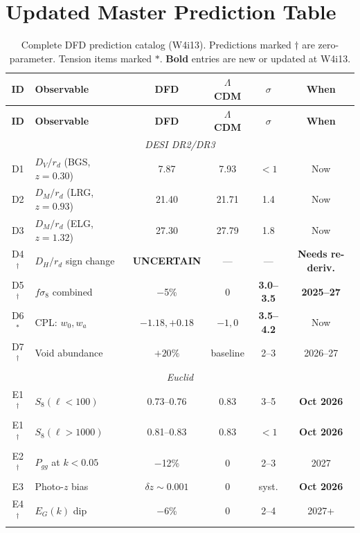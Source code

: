 \documentclass[11pt,a4paper]{article}
\newcommand{\LCDM}{$\Lambda$CDM}
\begin{document}
\section{Updated Master Prediction Table}
\label{sec:master_table}

\begin{longtable}{clcccc}
\caption{Complete DFD prediction catalog (W4i13). Predictions marked
$\dagger$ are zero-parameter. Tension items marked $\ast$. \textbf{Bold}
entries are new or updated at W4i13.} \\
\toprule
\textbf{ID} & \textbf{Observable} & \textbf{DFD} &
\textbf{\LCDM} & \textbf{$\sigma$} & \textbf{When} \\
\midrule
\endfirsthead
\toprule
\textbf{ID} & \textbf{Observable} & \textbf{DFD} &
\textbf{\LCDM} & \textbf{$\sigma$} & \textbf{When} \\
\midrule
\endhead
\multicolumn{6}{c}{\textit{DESI DR2/DR3}} \\
\midrule
D1 & $D_V/r_d$ (BGS, $z=0.30$) & 7.87 & 7.93 & $<1$ & Now \\
D2 & $D_M/r_d$ (LRG, $z=0.93$) & 21.40 & 21.71 & 1.4 & Now \\
D3 & $D_M/r_d$ (ELG, $z=1.32$) & 27.30 & 27.79 & 1.8 & Now \\
D4$^{\dagger}$ & $D_H/r_d$ sign change &
\textbf{UNCERTAIN} & --- & --- & \textbf{Needs re-deriv.} \\
D5$^{\dagger}$ & $f\sigma_8$ combined & $-$5\% & 0 &
\textbf{3.0--3.5} & \textbf{2025--27} \\
D6$^{\ast}$ & CPL: $w_0, w_a$ & $-1.18, +0.18$ & $-1, 0$ &
\textbf{3.5--4.2} & Now \\
D7$^{\dagger}$ & Void abundance & $+20\%$ & baseline & 2--3 & 2026--27 \\
\midrule
\multicolumn{6}{c}{\textit{Euclid}} \\
\midrule
E1$^{\dagger}$ & $S_8(\ell<100)$ & 0.73--0.76 & 0.83 & 3--5 &
\textbf{Oct 2026} \\
E1$^{\dagger}$ & $S_8(\ell>1000)$ & 0.81--0.83 & 0.83 & $<1$ &
\textbf{Oct 2026} \\
E2$^{\dagger}$ & $P_{gg}$ at $k < 0.05$ & $-$12\% & 0 & 2--3 & 2027 \\
E3 & Photo-$z$ bias & $\delta z \sim 0.001$ & 0 & syst. &
\textbf{Oct 2026} \\
E4$^{\dagger}$ & $E_G(k)$ dip & $-$6\% & 0 & 2--4 & 2027+ \\

\end{longtable}
\end{document}
